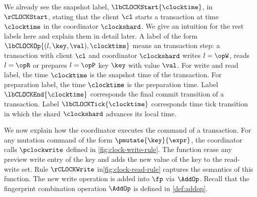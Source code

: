 We already see the snapshot label, \( \lbCLOCKStart{\clocktime} \), in \( \rCLOCKStart \),
stating that the client \( \cl \) starts a transaction at time \( \clocktime \) in the coordinator \( \clockshard \).
We give an intuition for the rest labels here and explain them in detail later.
A label of the form \( \lbCLOCKOp{(l,\key,\val),\clocktime} \) means an transaction step:
a transaction with  client \( \cl \) and coordinator \( \clockshard \)
writes \( l = \opW \), reads \( l = \opR \) or prepares \( l = \opP \)
key \( \key \) with value \( \val \).
For write and read label, the time \( \clocktime \) is the snapshot time of the transaction.
For preparation label, the time \( \clocktime \) is the preparation time.
Label \( \lbCLOCKEnd{\clocktime}\) corresponds the final commit transition of a transaction.
Label  \( \lbCLOCKTick{\clocktime} \) corresponds time tick transition 
in which the shard \( \clockshard \) advances its local time.

We now explain how the coordinator executes the command of a transaction.
For any mutation command of the form \( \pmutate{\key}{\expr}\), 
the coordinator calls \( \pclockwrite \) defined in \cref{fig:clock-write-rule}.
The function erase any preview write entry of the key and
adds the new value of the key to the read-write set.
Rule \( \rCLOCKWrite \) in\cref{fig:clock-read-rule} captures the semantics of this function.
The new write operation is added into \( \fp \) via \( \AddOp \).
Recall that the fingerprint combination operation \( \AddOp \) is defined in \cref{def:addop}.





